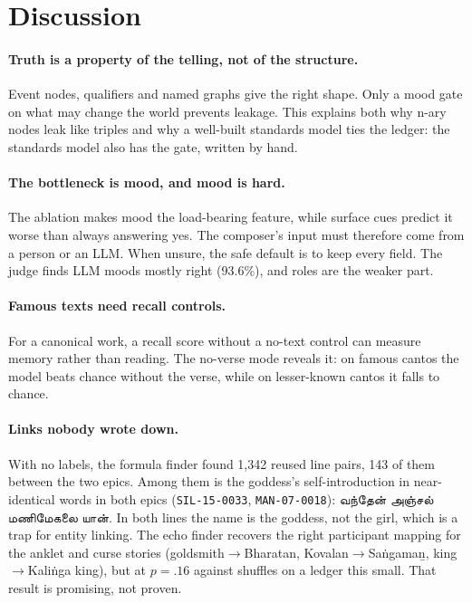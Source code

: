 \documentclass[11pt]{article}
\newcommand{\ta}[1]{{\tamilfont #1}}
\newcommand{\lid}[1]{\texttt{\small #1}}
\begin{document}
\section{Discussion}
\label{sec:discussion}

\paragraph{Truth is a property of the telling, not of the structure.} Event nodes, qualifiers and named graphs give the right shape. Only a mood gate on what may change the world prevents leakage. This explains both why n-ary nodes leak like triples and why a well-built standards model ties the ledger: the standards model also has the gate, written by hand.

\paragraph{The bottleneck is mood, and mood is hard.} The ablation makes mood the load-bearing feature, while surface cues predict it worse than always answering yes. The composer's input must therefore come from a person or an LLM. When unsure, the safe default is to keep every field. The judge finds LLM moods mostly right (93.6\%), and roles are the weaker part.

\paragraph{Famous texts need recall controls.} For a canonical work, a recall score without a no-text control can measure memory rather than reading. The no-verse mode reveals it: on famous cantos the model beats chance without the verse, while on lesser-known cantos it falls to chance.

\paragraph{Links nobody wrote down.} With no labels, the formula finder found 1,342 reused line pairs, 143 of them between the two epics. Among them is the goddess's self-introduction in near-identical words in both epics (\lid{SIL-15-0033}, \lid{MAN-07-0018}): \ta{வந்தேன் அஞ்சல் மணிமேகலை யான்}. In both lines the name is the goddess, not the girl, which is a trap for entity linking. The echo finder recovers the right participant mapping for the anklet and curse stories (goldsmith$\to$Bharatan, Kovalan$\to$Sa\.{n}gama\b{n}, king$\to$Kali\.{n}ga king), but at $p{=}.16$ against shuffles on a ledger this small. That result is promising, not proven.
\end{document}
